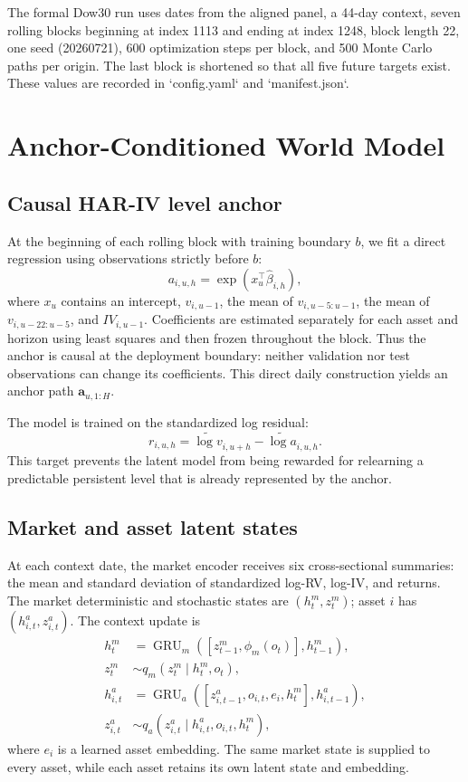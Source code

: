 \documentclass[11pt]{article}
\begin{document}
The formal Dow30 run uses dates from the aligned panel, a 44-day context, seven rolling blocks beginning at index 1113 and ending at index 1248, block length 22, one seed (20260721), 600 optimization steps per block, and 500 Monte Carlo paths per origin. The last block is shortened so that all five future targets exist. These values are recorded in `config.yaml` and `manifest.json`.

\section{Anchor-Conditioned World Model}

\subsection{Causal HAR-IV level anchor}

At the beginning of each rolling block with training boundary $b$, we fit a direct regression using observations strictly before $b$:
\begin{equation}
    a_{i,u,h}=\exp\left(x_u^\top\widehat\beta_{i,h}\right),
\end{equation}
where $x_u$ contains an intercept, $v_{i,u-1}$, the mean of $v_{i,u-5:u-1}$, the mean of $v_{i,u-22:u-5}$, and $IV_{i,u-1}$. Coefficients are estimated separately for each asset and horizon using least squares and then frozen throughout the block. Thus the anchor is causal at the deployment boundary: neither validation nor test observations can change its coefficients. This direct daily construction yields an anchor path $\mathbf a_{u,1:H}$.

The model is trained on the standardized log residual:
\begin{equation}
    r_{i,u,h}=\widetilde{\log v}_{i,u+h}-\widetilde{\log a}_{i,u,h}.
    \label{eq:residual}
\end{equation}
This target prevents the latent model from being rewarded for relearning a predictable persistent level that is already represented by the anchor.

\subsection{Market and asset latent states}

At each context date, the market encoder receives six cross-sectional summaries: the mean and standard deviation of standardized log-RV, log-IV, and returns. The market deterministic and stochastic states are $(h_t^m,z_t^m)$; asset $i$ has $(h_{i,t}^a,z_{i,t}^a)$. The context update is
\begin{align}
 h_t^m &= \operatorname{GRU}_m([z_{t-1}^m,\phi_m(o_t)],h_{t-1}^m),\\
 z_t^m &\sim q_m(z_t^m\mid h_t^m,o_t),\\
 h_{i,t}^a &= \operatorname{GRU}_a([z_{i,t-1}^a,o_{i,t},e_i,h_t^m],h_{i,t-1}^a),\\
 z_{i,t}^a &\sim q_a(z_{i,t}^a\mid h_{i,t}^a,o_{i,t},h_t^m),
\end{align}
where $e_i$ is a learned asset embedding. The same market state is supplied to every asset, while each asset retains its own latent state and embedding.
\end{document}
